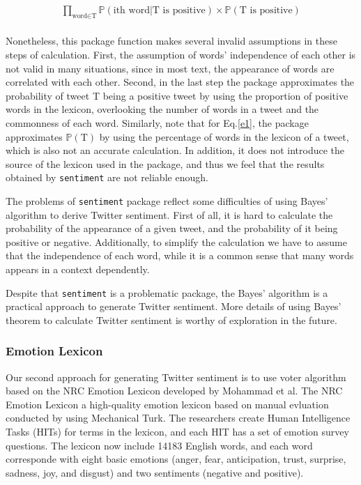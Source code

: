 \documentclass[10pt,letterpaper]{article}
\begin{document}
\begin{align}\label{e3}
\prod_{\text{word}\in \text{T}} \mathbb{P}(\text{ith word}|\text{T is positive})\times \mathbb{P}(\text{T is positive}) 
\end{align}
\\
\noindent Nonetheless, this package function makes several invalid assumptions in these steps of calculation. First, the assumption of words' independence of each other is not valid in many situations, since in most text, the appearance of words are correlated with each other. Second, in the last step the package approximates the probability of tweet T being a positive tweet by using the proportion of positive words in the lexicon, overlooking the number of words in a tweet and the commonness of each word. Similarly, note that for Eq.\ref{e1}, the package approximates $\mathbb{P}(\text{T})$ by using the percentage of words in the lexicon of a tweet, which is also not an accurate calculation. In addition, it does not introduce the source of the lexicon used in the package, and thus we feel that the results obtained by \texttt{sentiment} are not reliable enough. 


The problems of \texttt{sentiment} package reflect some difficulties of using Bayes' algorithm to derive Twitter sentiment. First of all, it is hard to calculate the probability of the appearance of a given tweet, and the probability of it being positive or negative. Additionally, to simplify the calculation we have to assume that the independence of each word, while it is a common sense that many words appears in a context dependently. 



Despite that \texttt{sentiment} is a problematic package, the Bayes' algorithm is a practical approach to generate Twitter sentiment. More details of using Bayes' theorem to calculate Twitter sentiment is worthy of exploration in the future. 




\subsubsection{Emotion Lexicon}
Our second approach for generating Twitter sentiment is to use voter algorithm based on the NRC Emotion Lexicon developed by Mohammad et al\cite{mohammad2010emotions}. The NRC Emotion Lexicon a high-quality emotion lexicon based on manual evluation conducted by using Mechanical Turk\cite{callison2009fast}. The researchers create Human Intelligence Tasks (HITs) for terms in the lexicon, and each HIT has a set of emotion survey questions. The lexicon now include 14183 English words, and each word corresponde with eight basic emotions (anger, fear, anticipation, trust, surprise, sadness, joy, and disgust) and two sentiments (negative and positive). 
\end{document}
